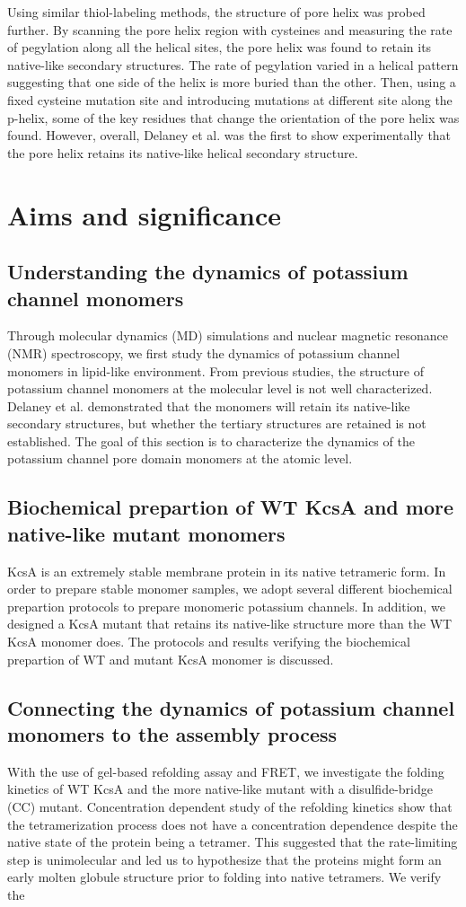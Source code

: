 Using similar thiol-labeling methods, the structure of pore helix was probed further. By scanning the pore helix region with cysteines and measuring the rate of pegylation along all the helical sites, the pore helix was found to retain its native-like secondary structures. The rate of pegylation varied in a helical pattern suggesting that one side of the helix is more buried than the other. Then, using a fixed cysteine mutation site and introducing mutations at different site along the p-helix, some of the key residues that change the orientation of the pore helix was found. However, overall, Delaney et al. was the first to show experimentally that the pore helix retains its native-like helical secondary structure.

\section{Aims and significance}
\subsection{Understanding the dynamics of potassium channel monomers}
Through molecular dynamics (MD) simulations and nuclear magnetic resonance (NMR) spectroscopy, we first study the dynamics of potassium channel monomers in lipid-like environment. From previous studies, the structure of potassium channel monomers at the molecular level is not well characterized. Delaney et al. demonstrated that the monomers will retain its native-like secondary structures, but whether the tertiary structures are retained is not established. The goal of this section is to characterize the dynamics of the potassium channel pore domain monomers at the atomic level.

\subsection{Biochemical prepartion of WT KcsA and more native-like mutant monomers}
KcsA is an extremely stable membrane protein in its native tetrameric form. In order to prepare stable monomer samples, we adopt several different biochemical prepartion protocols to prepare monomeric potassium channels. In addition, we designed a KcsA mutant that retains its native-like structure more than the WT KcsA monomer does. The protocols and results verifying the biochemical prepartion of WT and mutant KcsA monomer is discussed.

\subsection{Connecting the dynamics of potassium channel monomers to the assembly process}
With the use of gel-based refolding assay and FRET, we investigate the folding kinetics of WT KcsA and the more native-like mutant with a disulfide-bridge (CC) mutant. Concentration dependent study of the refolding kinetics show that the tetramerization process does not have a concentration dependence despite the native state of the protein being a tetramer. This suggested that the rate-limiting step is unimolecular and led us to hypothesize that the proteins might form an early molten globule structure prior to folding into native tetramers. We verify the 

